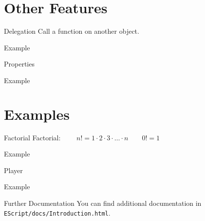 \documentclass[ucs,9pt]{beamer}
\begin{document}

\section{Other Features}
\begin{frame}{Delegation}
	Call a function on another object.
	\begin{block}{Example}
		
	\end{block}
\end{frame}

\begin{frame}{Properties}
	\begin{block}{Example}
		
	\end{block}
\end{frame}

\section{Examples}
\begin{frame}{Factorial}
	Factorial: $\qquad n! = 1 \cdot 2 \cdot 3 \cdot \ldots \cdot n \qquad 0! = 1$
	\begin{block}{Example}
		
	\end{block}
\end{frame}

\begin{frame}{Player}
	\begin{block}{Example}
		
	\end{block}
\end{frame}

\begin{frame}{Further Documentation}
	You can find additional documentation in \texttt{EScript/docs/Introduction.html}.
\end{frame}



\end{document}
